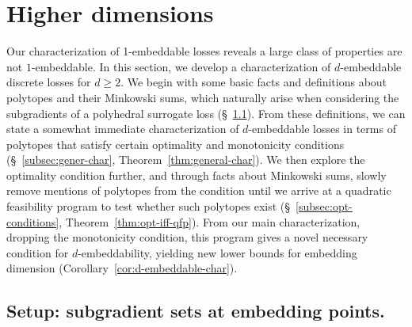 \documentclass[final]{colt2020} %
\newcommand{\reals}{\mathbb{R}}
\newcommand{\R}{\mathcal{R}}
\newcommand{\Y}{\mathcal{Y}}
\newcommand{\inprod}[2]{\langle #1, #2 \rangle}%
\begin{document}
\section{Higher dimensions}\label{sec:d-dim}

Our characterization of 1-embeddable losses reveals a large class of properties are not $1$-embeddable.
In this section, we develop a characterization of $d$-embeddable discrete losses for $d \geq 2$.
We begin with some basic facts and definitions about polytopes and their Minkowski sums, which naturally arise when considering the subgradients of a polyhedral surrogate loss (\S~\ref{subsec:sub-sets}).
From these definitions, we can state a somewhat immediate characterization of $d$-embeddable losses in terms of polytopes that satisfy certain optimality and monotonicity conditions (\S~\ref{subsec:gener-char}, Theorem~\ref{thm:general-char}).
We then explore the optimality condition further, and through facts about Minkowski sums, slowly remove mentions of polytopes from the condition until we arrive at a quadratic feasibility program to test whether such polytopes exist (\S~\ref{subsec:opt-conditions}, Theorem~\ref{thm:opt-iff-qfp}).
From our main characterization, dropping the monotonicity condition, this program gives a novel necessary condition for $d$-embeddability, yielding new lower bounds for embedding dimension (Corollary~\ref{cor:d-embeddable-char}).

\subsection{Setup: subgradient sets at embedding points.}\label{subsec:sub-sets}
\end{document}
